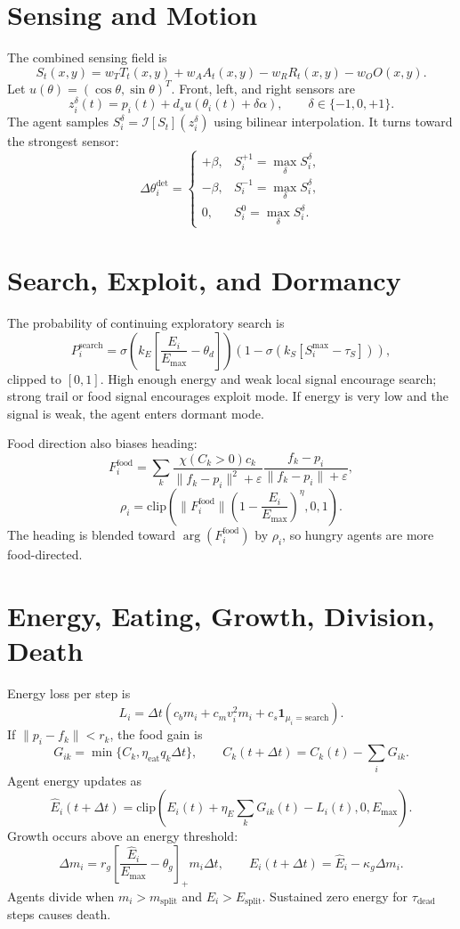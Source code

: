 \documentclass[11pt]{article}
\begin{document}
\section{Sensing and Motion}
The combined sensing field is
\[
S_t(x,y)=w_TT_t(x,y)+w_AA_t(x,y)-w_RR_t(x,y)-w_OO(x,y).
\]
Let $u(\theta)=(\cos\theta,\sin\theta)^T$. Front, left, and right sensors are
\[
z_i^\delta(t)=p_i(t)+d_su(\theta_i(t)+\delta\alpha),
\qquad \delta\in\{-1,0,+1\}.
\]
The agent samples $S_i^\delta=\mathcal I[S_t](z_i^\delta)$ using bilinear
interpolation. It turns toward the strongest sensor:
\[
\Delta\theta_i^{\mathrm{det}}=
\begin{cases}
+\beta,& S_i^{+1}=\max_\delta S_i^\delta,\\
-\beta,& S_i^{-1}=\max_\delta S_i^\delta,\\
0,& S_i^{0}=\max_\delta S_i^\delta.
\end{cases}
\]

\section{Search, Exploit, and Dormancy}
The probability of continuing exploratory search is
\[
P_i^{\mathrm{search}}=
\sigma\left(k_E\left[\frac{E_i}{E_{\max}}-\theta_d\right]\right)
\left(1-\sigma\left(k_S[S_i^{\max}-\tau_S]\right)\right),
\]
clipped to $[0,1]$. High enough energy and weak local signal encourage search;
strong trail or food signal encourages exploit mode. If energy is very low and
the signal is weak, the agent enters dormant mode.

Food direction also biases heading:
\[
F_i^{\mathrm{food}}=\sum_k
\frac{\chi(C_k>0)c_k}{\|f_k-p_i\|^2+\varepsilon}
\frac{f_k-p_i}{\|f_k-p_i\|+\varepsilon},
\]
\[
\rho_i=\mathrm{clip}\left(\|F_i^{\mathrm{food}}\|
\left(1-\frac{E_i}{E_{\max}}\right)^\eta,0,1\right).
\]
The heading is blended toward $\arg(F_i^{\mathrm{food}})$ by $\rho_i$, so
hungry agents are more food-directed.

\section{Energy, Eating, Growth, Division, Death}
Energy loss per step is
\[
L_i=\Delta t(c_bm_i+c_mv_i^2m_i+c_s\mathbf 1_{\mu_i=\mathrm{search}}).
\]
If $\|p_i-f_k\|<r_k$, the food gain is
\[
G_{ik}=\min\{C_k,\eta_{\mathrm{eat}}q_k\Delta t\},
\qquad
C_k(t+\Delta t)=C_k(t)-\sum_iG_{ik}.
\]
Agent energy updates as
\[
\hat E_i(t+\Delta t)=
\mathrm{clip}\left(E_i(t)+\eta_E\sum_kG_{ik}(t)-L_i(t),0,E_{\max}\right).
\]
Growth occurs above an energy threshold:
\[
\Delta m_i=r_g\left[\frac{\hat E_i}{E_{\max}}-\theta_g\right]_+m_i\Delta t,
\qquad
E_i(t+\Delta t)=\hat E_i-\kappa_g\Delta m_i.
\]
Agents divide when $m_i>m_{\mathrm{split}}$ and
$E_i>E_{\mathrm{split}}$. Sustained zero energy for
$\tau_{\mathrm{dead}}$ steps causes death.
\end{document}

